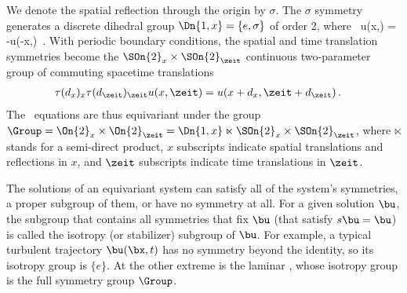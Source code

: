 



We denote the spatial reflection through the origin by $\sigma$.
The $\sigma$ symmetry generates a discrete dihedral group
$\Dn{1,x} = \{e,\sigma\}$ of order 2, where
\beq
\sigma\, u(x,\zeit) = -u(-x,\zeit)
\label{sigma}
\,.
\eeq
With periodic boundary conditions, the spatial and time translation
symmetries become the $\SOn{2}_x \times \SOn{2}_\zeit$ continuous two-parameter
group of commuting spacetime translations
\begin{align}
\tau(\shift_x)_x\tau(\shift_\zeit)_\zeit u(x,\zeit)
    &= u(x+\shift_x, \zeit+ \shift_\zeit)
\,.
\label{translation}
\end{align}
The \KS\ equations are thus equivariant under the group
$\Group = \On{2}_x \times \On{2}_\zeit = \Dn{1,x} \ltimes \SOn{2}_{x} \times \SOn{2}_\zeit$,
where $\ltimes$ stands for a semi-direct product,
$x$  subscripts indicate spatial translations
and reflections in $x$, and $\zeit$ subscripts indicate time translations
in $\zeit$.

The solutions of an equivariant system can satisfy all of
the system's symmetries, a proper subgroup of them, or
have no symmetry at all. For a given solution $\bu$, the
subgroup that contains all symmetries that fix $\bu$ (that satisfy
$s \bu = \bu$) is called the isotropy (or stabilizer) subgroup of
$\bu$. For example, a typical
turbulent trajectory $\bu(\bx,t)$ has no symmetry beyond the identity,
so its isotropy group is $\{e\}$. At the other extreme is the laminar
{\eqv}, whose isotropy group is the full symmetry
group $\Group$.

